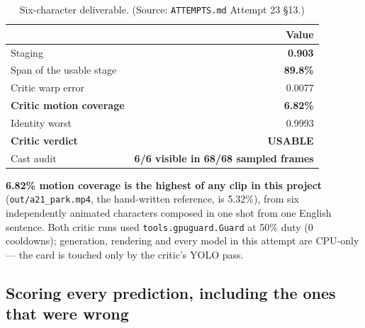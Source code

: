 \documentclass[11pt]{article}
\newcommand{\secsym}{\S}
\begin{document}
\begin{table}[h]
\centering
\caption{Six-character deliverable. (Source: \texttt{ATTEMPTS.md} Attempt 23 \secsym13.)}
\label{tab:sixcast}
\begin{tabular}{@{}lr@{}}
\toprule
 & Value \\
\midrule
Staging & \textbf{0.903} \\
Span of the usable stage & \textbf{89.8\%} \\
Critic warp error & 0.0077 \\
\textbf{Critic motion coverage} & \textbf{6.82\%} \\
Identity worst & 0.9993 \\
\textbf{Critic verdict} & \textbf{USABLE} \\
Cast audit & \textbf{6/6 visible in 68/68 sampled frames} \\
\bottomrule
\end{tabular}
\end{table}

\textbf{6.82\% motion coverage is the highest of any clip in this
project} (\texttt{out/a21\_park.mp4}, the hand-written reference, is
5.32\%), from six independently animated characters composed in one shot
from one English sentence. Both critic runs used
\texttt{tools.gpuguard.Guard} at 50\% duty (0 cooldowns); generation,
rendering and every model in this attempt are CPU-only --- the card is
touched only by the critic's YOLO pass.

\subsection{Scoring every prediction, including the ones that were wrong}
\label{sec:scoringpredictions}
\end{document}
